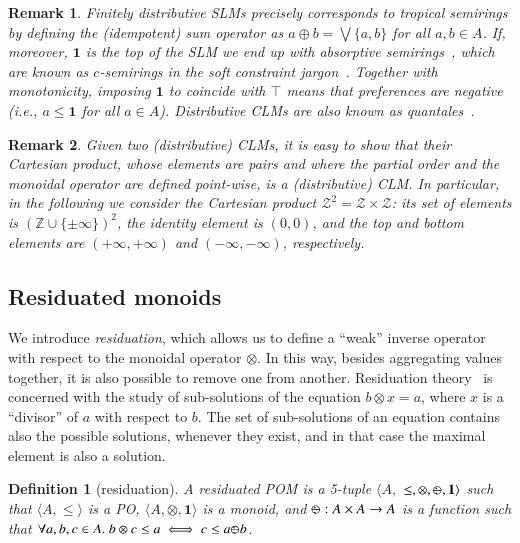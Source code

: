 \documentclass[a4paper]{elsarticle}
\newtheorem{definition}{Definition}
\newtheorem{remark}{Remark}
\newcommand{\1}{\mathbf{1}}
\def\odiv{{ \ominus\hspace{-8pt}:}\;}
\begin{document}
\begin{remark}\label{remTrop}
	Finitely distributive SLMs precisely corresponds to \emph{tropical} semirings 
	by defining the (idempotent) sum operator as
	$a \oplus b = \bigvee \{a, b\}$ for all $a,b \in A$.
	If, moreover, $\1$ is the top of the SLM we end up 
	with \emph{absorptive} semirings~\cite{golan}, 
	which are known as $c$-semirings 
	in the soft constraint jargon~\cite{jacm97}.
	Together with monotonicity, imposing $\1$ to coincide with $\top$ means 
	that preferences are negative (i.e., $a \leq \1$ for all $a \in A$).
	Distributive CLMs are also known as \emph{quantales}~\cite{quantales}.
\end{remark}

\begin{remark}
	\label{remark}
	Given two (distributive) CLMs, it is easy to show that their Cartesian product, whose elements are pairs and where the partial order and the monoidal operator are 
	defined point-wise, is a (distributive) CLM.
	In particular, in the following we consider the Cartesian product $\mathcal{Z}^2 = \mathcal{Z} \times \mathcal{Z}$:
	its set of
	elements is $(\mathbb{Z} \cup \{\pm \infty\})^2$, the identity element is $(0,0)$,
	and the top and bottom elements are $(+\infty, +\infty)$ and $(-\infty, -\infty)$, respectively.
\end{remark}

\subsection{Residuated monoids}

We introduce \emph{residuation}, which allows us to define a ``weak'' inverse 
operator with respect to the monoidal operator $\otimes$. 
In this way, besides aggregating values together, it is also possible to remove one from 
another. Residuation theory~\cite{golan} is concerned with the study of sub-solutions of the 
equation $b \otimes x = a$, where $x$ is a ``divisor'' of $a$ with respect to $b$. 
The set of sub-solutions of an equation contains also the 
possible solutions, whenever they exist, and in that case the maximal element is also a 
solution.

\begin{definition}[residuation]
	A residuated POM is a 5-tuple $\langle A,$ $\leq, \otimes,  \odiv, \1 \rangle$ such that
	$\langle A, \leq \rangle$ is a PO,  $\langle A, \otimes, \1 \rangle$ is a monoid, and
	$\odiv: A \times A \rightarrow A$ is a function such that $\forall a, b, c \in A.\ b \otimes c \leq a \iff c \leq a \odiv b$.
\end{definition}
\end{document}
